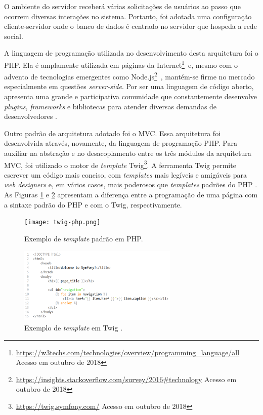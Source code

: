 O ambiente do servidor receberá várias solicitações de usuários ao passo que ocorrem diversas interações no sistema. Portanto, foi adotada uma configuração cliente-servidor onde o banco de dados é centrado no servidor que hospeda a rede social.

A linguagem de programação utilizada no desenvolvimento desta arquitetura foi o PHP. Ela é amplamente utilizada em páginas da Internet\footnote{\url{https://w3techs.com/technologies/overview/programming_language/all} Acesso em outubro de 2018}~e, mesmo com o advento de tecnologias emergentes como Node.js\footnote{\url{https://insights.stackoverflow.com/survey/2016\#technology} Acesso em outubro de 2018}~, mantém-se firme no mercado especialmente em questões \textit{server-side}. Por ser uma linguagem de código aberto, apresenta uma grande e participativa comunidade que constantemente desenvolve \textit{plugins}, \textit{frameworks} e bibliotecas para atender diversas demandas de desenvolvedores \cite{phpPatternsArticle2016}. 

Outro padrão de arquitetura adotado foi o MVC. Essa arquitetura foi desenvolvida através, novamente, da linguagem de programação PHP. Para auxiliar na abstração e no desacoplamento entre os três módulos da arquitetura MVC, foi utilizado o motor de \textit{template} Twig\footnote{\url{https://twig.symfony.com/} Acesso em outubro de 2018}. A ferramenta Twig  permite escrever um código mais conciso, com \textit{templates} mais legíveis e amigáveis para \textit{web designers} e, em vários casos, mais poderosos que \textit{templates} padrões do PHP \cite{symfonyBook}. As Figuras \ref{codeTemplatePHP} e \ref{codeTemplateTwig} apresentam a diferença entre a programação de uma página com a sintaxe padrão do PHP e com o Twig, respectivamente.

\begin{figure}[ht]
    \caption{Exemplo de \textit{template} padrão em PHP.}
       	\begin{center}
            \texttt{[image: twig-php.png]}
        \end{center}
    \label{codeTemplatePHP}
\end{figure}

\bigskip

\begin{figure}[ht]
    \caption{Exemplo de \textit{template} em Twig .}
       	\begin{center}
            \includegraphics[width=0.68\textwidth]{figuras/twig-symf.png}
        \end{center}
    \label{codeTemplateTwig}
\end{figure}


